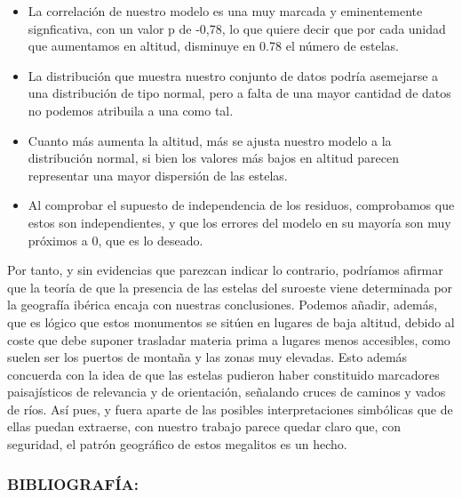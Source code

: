 \documentclass[
]{article}
\providecommand{\tightlist}{%
  \setlength{\itemsep}{0pt}\setlength{\parskip}{0pt}}
\begin{document}
\begin{itemize}
\tightlist
\item
  La correlación de nuestro modelo es una muy marcada y eminentemente
  signficativa, con un valor p de -0,78, lo que quiere decir que por
  cada unidad que aumentamos en altitud, disminuye en 0.78 el número de
  estelas.
\item
  La distribución que muestra nuestro conjunto de datos podría
  asemejarse a una distribución de tipo normal, pero a falta de una
  mayor cantidad de datos no podemos atribuila a una como tal.
\item
  Cuanto más aumenta la altitud, más se ajusta nuestro modelo a la
  distribución normal, si bien los valores más bajos en altitud parecen
  representar una mayor dispersión de las estelas.
\item
  Al comprobar el supuesto de independencia de los residuos, comprobamos
  que estos son independientes, y que los errores del modelo en su
  mayoría son muy próximos a 0, que es lo deseado.
\end{itemize}

Por tanto, y sin evidencias que parezcan indicar lo contrario, podríamos
afirmar que la teoría de que la presencia de las estelas del suroeste
viene determinada por la geografía ibérica encaja con nuestras
conclusiones. Podemos añadir, además, que es lógico que estos monumentos
se sitúen en lugares de baja altitud, debido al coste que debe suponer
trasladar materia prima a lugares menos accesibles, como suelen ser los
puertos de montaña y las zonas muy elevadas. Esto además concuerda con
la idea de que las estelas pudieron haber constituido marcadores
paisajísticos de relevancia y de orientación, señalando cruces de
caminos y vados de ríos. Así pues, y fuera aparte de las posibles
interpretaciones simbólicas que de ellas puedan extraerse, con nuestro
trabajo parece quedar claro que, con seguridad, el patrón geográfico de
estos megalitos es un hecho.

\hypertarget{bibliografuxeda}{%
\subsubsection{BIBLIOGRAFÍA:}\label{bibliografuxeda}}
\end{document}
